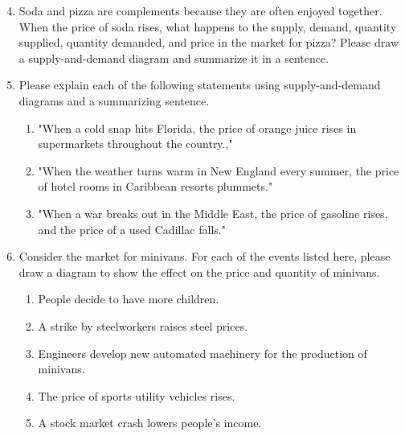 \documentclass{article}
\begin{document}
\begin{enumerate}
\setcounter{enumi}{3}

\item Soda and pizza are complements because they are often enjoyed together. When the price of soda rises, what happens to the supply, demand, quantity supplied, quantity demanded, and price in the market for pizza? Please draw a supply-and-demand diagram and summarize it in a sentence.

\item Please explain each of the following statements using supply-and-demand diagrams and a summarizing sentence.

	\begin{enumerate}
	
	\item "When a cold snap hits Florida, the price of orange juice rises in supermarkets throughout the country.,"
	
	\item "When the weather turns warm in New England every summer, the price of hotel rooms in Caribbean resorts plummets."
	
	\item "When a war breaks out in the Middle East, the price of gasoline rises, and the price of a used Cadillac falls."
	
	\end{enumerate}
	
\item Consider the market for minivans. For each of the events listed here, please draw a diagram to show the effect on the price and quantity of minivans.

	\begin{enumerate}
	
	\item People decide to have more children.
	
	\item A strike by steelworkers raises steel prices.
	
	\item Engineers develop new automated machinery for the production of minivans.
	
	\item The price of sports utility vehicles rises.
	
	\item A stock market crash lowers people's income.
	
	\end{enumerate}
	

\end{enumerate}
\end{document}
